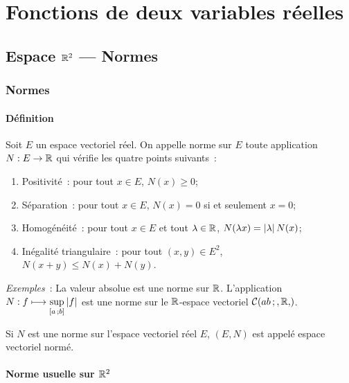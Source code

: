 \chapter{Fonctions de deux variables réelles}\label{chap:fonctions2variables}
\minitoc%
\minilof%
\minilot%

\section{Espace \(\mathbb{R}^2\) --- Normes}

\subsection{Normes}

\subsubsection{Définition}

\begin{defdef}
  Soit \(E\) un espace vectoriel réel. On appelle norme sur \(E\) toute
  application \(N : E \to \mathbb{R}\) qui vérifie les quatre points suivants~:
  \begin{enumerate}
    \item Positivité~: pour tout \(x \in E\), \(N(x)\geqslant 0\);
    \item Séparation~: pour tout \(x \in E\), \(N(x)=0\) si et seulement
      \(x=0\);
    \item Homogénéité~: pour tout \(x \in E\) et tout \(\lambda \in \mathbb{R}\),
      \(N(\lambda x)=\left\lvert\lambda\right\rvert N(x)\);
    \item Inégalité triangulaire~: pour tout \((x, y) \in E^2\), \(N(x+y)
      \leqslant N(x) + N(y)\).
  \end{enumerate}
\end{defdef}

\emph{Exemples}~: La valeur absolue est une norme sur \(\mathbb{R}\). L'application \(N
: f \longmapsto \sup\limits_{\left[ a \, ; {} b \right]} \left\lvert f\right\rvert\) est une norme sur le
\(\mathbb{R}\)-espace vectoriel \(\cont{\intervalle{a}{b}, \R}\).

\begin{defdef}
  Si \(N\) est une norme sur l'espace vectoriel réel \(E\), \((E, N)\) est
  appelé espace vectoriel normé.
\end{defdef}

\subsubsection{Norme usuelle sur \(\mathbb{R}^2\)}


